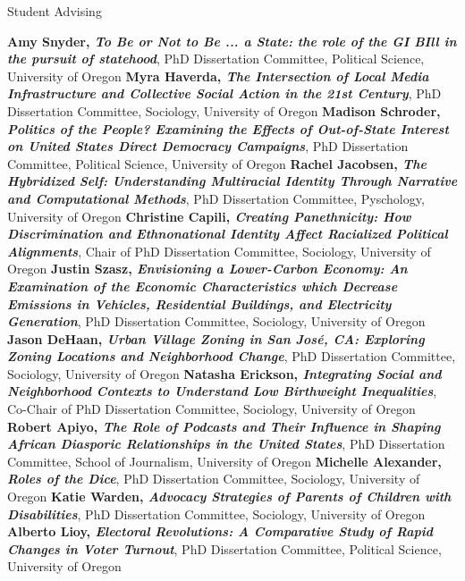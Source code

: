 \begin{rubric}{Student Advising}



\entry*[Current] \textbf{Amy Snyder, \emph{To Be or Not to Be ... a State: the role of the GI BIll in the pursuit of statehood}}, PhD Dissertation Committee, Political Science, University of Oregon  
\entry*[2026] \textbf{Myra Haverda, \emph{The Intersection of Local Media Infrastructure and Collective Social Action in the 21st Century}}, PhD Dissertation Committee, Sociology, University of Oregon  
\entry*[2026] \textbf{Madison Schroder, \emph{Politics of the People? Examining the Effects of Out-of-State Interest on United States Direct Democracy Campaigns}}, PhD Dissertation Committee, Political Science, University of Oregon  
\entry*[2025] \textbf{Rachel Jacobsen, \emph{The Hybridized Self: Understanding Multiracial Identity
Through Narrative and Computational Methods}}, PhD Dissertation Committee, Pyschology, University of Oregon  
\entry*[2025] \textbf{Christine Capili, \emph{Creating Panethnicity: How Discrimination and Ethnonational Identity Affect Racialized Political Alignments}}, Chair of PhD Dissertation Committee, Sociology, University of Oregon  
\entry*[2025] \textbf{Justin Szasz, \emph{Envisioning a Lower-Carbon Economy: An Examination of the Economic Characteristics which Decrease Emissions in Vehicles, Residential Buildings, and Electricity Generation}}, PhD Dissertation Committee, Sociology, University of Oregon  
\entry*[2025] \textbf{Jason DeHaan, \emph{Urban Village Zoning in San José, CA: Exploring Zoning Locations and Neighborhood Change}}, PhD Dissertation Committee, Sociology, University of Oregon  
\entry*[2024] \textbf{Natasha Erickson, \emph{Integrating Social and Neighborhood Contexts to Understand Low
Birthweight Inequalities}}, Co-Chair of PhD Dissertation Committee, Sociology, University of Oregon  
\entry*[2024] \textbf{Robert Apiyo, \emph{The Role of Podcasts and Their Influence in Shaping African Diasporic Relationships in the United States}}, PhD Dissertation Committee, School of Journalism, University of Oregon  
\entry*[2022] \textbf{Michelle Alexander, \emph{Roles of the Dice}}, PhD Dissertation Committee, Sociology, University of Oregon  
\entry*[2020] \textbf{Katie Warden, \emph{Advocacy Strategies of Parents of Children with Disabilities}}, PhD Dissertation Committee, Sociology, University of Oregon  
\entry*[2020] \textbf{Alberto Lioy, \emph{Electoral Revolutions: A Comparative Study of Rapid Changes in Voter Turnout}}, PhD Dissertation Committee, Political Science, University of Oregon  

\end{rubric}
